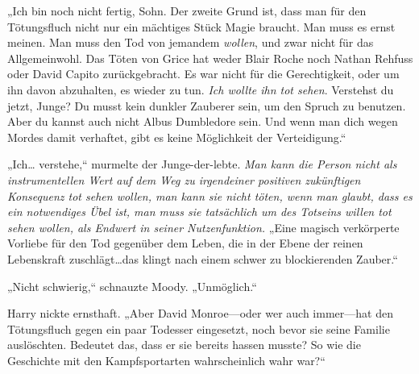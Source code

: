 „Ich bin noch nicht fertig, Sohn. Der zweite Grund ist, dass man für den Tötungsfluch nicht nur ein mächtiges Stück Magie braucht. Man muss es ernst meinen. Man muss den Tod von jemandem \emph{wollen}, und zwar nicht für das Allgemeinwohl. Das Töten von Grice hat weder Blair Roche noch Nathan Rehfuss oder David Capito zurückgebracht. Es war nicht für die Gerechtigkeit, oder um ihn davon abzuhalten, es wieder zu tun. \emph{Ich wollte ihn tot sehen}. Verstehst du jetzt, Junge? Du musst kein dunkler Zauberer sein, um den Spruch zu benutzen. Aber du kannst auch nicht Albus Dumbledore sein. Und wenn man dich wegen Mordes damit verhaftet, gibt es keine Möglichkeit der Verteidigung.“

„Ich… verstehe,“ murmelte der Junge-der-lebte.
\emph{Man kann die Person nicht als instrumentellen Wert auf dem Weg zu irgendeiner positiven zukünftigen Konsequenz tot sehen wollen, man kann sie nicht töten, wenn man glaubt, dass es ein notwendiges Übel ist, man muss sie tatsächlich um des Totseins willen tot sehen wollen, als Endwert in seiner Nutzenfunktion.}
„Eine magisch verkörperte Vorliebe für den Tod gegenüber dem Leben, die in der Ebene der reinen Lebenskraft zuschlägt…das klingt nach einem schwer zu blockierenden Zauber.“

„Nicht schwierig,“ schnauzte Moody. „Unmöglich.“

Harry nickte ernsthaft.
„Aber David Monroe—oder wer auch immer—hat den Tötungsfluch gegen ein paar Todesser eingesetzt, noch bevor sie seine Familie auslöschten. Bedeutet das, dass er sie bereits hassen musste? So wie die Geschichte mit den Kampfsportarten wahrscheinlich wahr war?“

